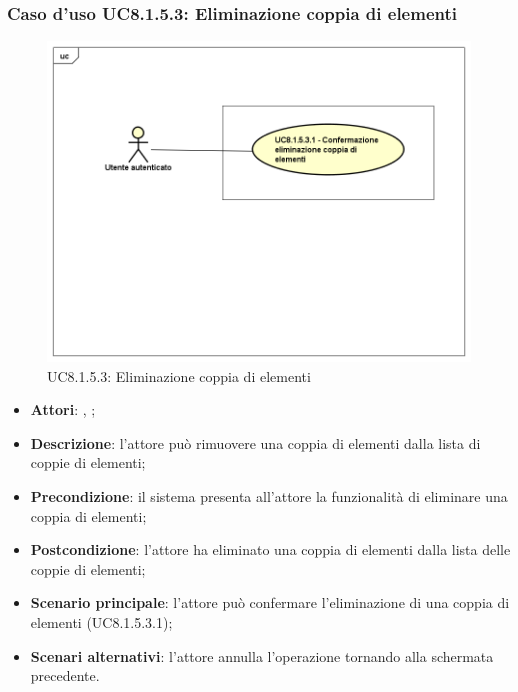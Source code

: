 	\subsubsection{Caso d'uso UC8.1.5.3: Eliminazione coppia di elementi}
	\begin{figure}[h]
		\centering
		\includegraphics[scale=0.5,keepaspectratio]{UML/UC8_1_5_3.png}
		\caption{UC8.1.5.3: Eliminazione coppia di elementi}
	\end{figure}
	\FloatBarrier
	\begin{itemize}
		\item \textbf{Attori}: \uau, \uaupro;
		\item \textbf{Descrizione}: l'attore può rimuovere una coppia di elementi dalla lista di coppie di elementi;
		\item \textbf{Precondizione}: il sistema presenta all'attore la funzionalità di eliminare una coppia di elementi;
		\item \textbf{Postcondizione}: l'attore ha eliminato una coppia di elementi dalla lista delle coppie di elementi;
		\item \textbf{Scenario principale}: l'attore può confermare l'eliminazione di una coppia di elementi (UC8.1.5.3.1);	
		\item \textbf{Scenari alternativi}: l'attore annulla l'operazione tornando alla schermata precedente.
	\end{itemize}

